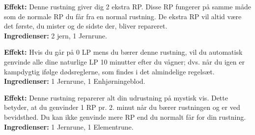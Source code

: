\begin{runerustning*}
\textbf{Effekt:} Denne rustning giver dig 2 ekstra RP. Disse RP fungerer på samme måde som de normale RP du får fra en normal rustning. De ekstra RP vil altid være det første, du mister og de sidste der, bliver repareret.\\
\textbf{Ingredienser:} 2 jern, 1 Jernrune.
\end{runerustning*}

\begin{runerustning*}
\textbf{Effekt:} Hvis du går på 0 LP mens du bærer denne rustning, vil du automatisk genvinde alle dine naturlige LP 10 minutter efter du vågner; dvs. når du igen er kampdygtig ifølge dødsreglerne, som findes i det almindelige regelsæt.\\
\textbf{Ingredienser:} 1 Jernrune, 1 Enhjørningeblod.
\end{runerustning*}

\begin{runerustning*}
\textbf{Effekt:} Denne rustning reparerer alt din udrustning på mystisk vis. Dette betyder, at du genvinder 1 RP pr. 2. minut når du bærer rustningen og er ved bevidsthed. Du kan ikke genvinde mere RP end du normalt får for din rustning.\\
\textbf{Ingredienser:} 1 Jernrune, 1 Elementrune.
\end{runerustning*}